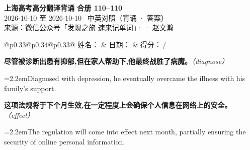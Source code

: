 \documentclass[11pt,a4paper]{article}
\newcommand{\num}[1]{\makebox[1.9em][r]{#1.}\hspace{0.3em}}
\newcommand{\prompt}[1]{\emph{\textcolor{tipblue}{\small（#1）}}}
\begin{document}
\pagestyle{plain}
\begin{center}
{\LARGE\bfseries 上海高考高分翻译背诵 \quad 合册 110–110}\\[0.25em]
{\large 2026-10-10 至 2026-10-10 \quad\ 中英对照（背诵 · 答案）}\\[0.35em]
{\footnotesize 来源：微信公众号「发现之旅 速来记单词」·  · 赵文瀚}
\end{center}

\vspace{0.4em}
\noindent\begin{tabular}{@{}p{0.33\textwidth}@{}p{0.34\textwidth}@{}p{0.33\textwidth}@{}}
姓名：\underline{\hspace{2.0cm}} & 日期：\underline{\hspace{2.0cm}} & 得分：\underline{\hspace{1.4cm}}\,/ \\
\end{tabular}

\vspace{0.5em}

\vspace{0.8em}
\vspace{0.35em}\vspace{0.15em}

\begin{minipage}{\linewidth}

\num{1}\textbf{尽管被诊断出患有抑郁,但在家人帮助下,他最终战胜了病魔。}\prompt{diagnose}

\vspace{0.15em}

\noindent\hangindent=2.2em\hspace{2.2em}Diagnosed with depression, he eventually overcame the illness with his family’s support.

\end{minipage}

\begin{minipage}{\linewidth}

\num{2}\textbf{这项法规将于下个月生效,在一定程度上会确保个人信息在网络上的安全。}\prompt{effect}

\vspace{0.15em}

\noindent\hangindent=2.2em\hspace{2.2em}The regulation will come into effect next month, partially ensuring the security of online personal information.

\end{minipage}
\end{document}
